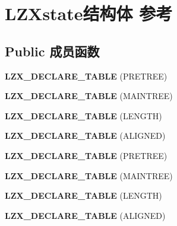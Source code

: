 \hypertarget{struct_l_z_xstate}{}\section{L\+Z\+Xstate结构体 参考}
\label{struct_l_z_xstate}
\subsection*{Public 成员函数}
\begin{DoxyCompactItemize}
\item 
\mbox{\label{struct_l_z_xstate_a576beb3aa07eb9cf307114e1fdc7f151}} 
{\bfseries L\+Z\+X\+\_\+\+D\+E\+C\+L\+A\+R\+E\+\_\+\+T\+A\+B\+LE} (P\+R\+E\+T\+R\+EE)
\item 
\mbox{\label{struct_l_z_xstate_a076e14ff04819bcc628829af24d9b122}} 
{\bfseries L\+Z\+X\+\_\+\+D\+E\+C\+L\+A\+R\+E\+\_\+\+T\+A\+B\+LE} (M\+A\+I\+N\+T\+R\+EE)
\item 
\mbox{\label{struct_l_z_xstate_af152c9d92b18f809675a283d7869143e}} 
{\bfseries L\+Z\+X\+\_\+\+D\+E\+C\+L\+A\+R\+E\+\_\+\+T\+A\+B\+LE} (L\+E\+N\+G\+TH)
\item 
\mbox{\label{struct_l_z_xstate_abf37582d65f7f45b91b41280c244d85a}} 
{\bfseries L\+Z\+X\+\_\+\+D\+E\+C\+L\+A\+R\+E\+\_\+\+T\+A\+B\+LE} (A\+L\+I\+G\+N\+ED)
\item 
\mbox{\label{struct_l_z_xstate_a576beb3aa07eb9cf307114e1fdc7f151}} 
{\bfseries L\+Z\+X\+\_\+\+D\+E\+C\+L\+A\+R\+E\+\_\+\+T\+A\+B\+LE} (P\+R\+E\+T\+R\+EE)
\item 
\mbox{\label{struct_l_z_xstate_a076e14ff04819bcc628829af24d9b122}} 
{\bfseries L\+Z\+X\+\_\+\+D\+E\+C\+L\+A\+R\+E\+\_\+\+T\+A\+B\+LE} (M\+A\+I\+N\+T\+R\+EE)
\item 
\mbox{\label{struct_l_z_xstate_af152c9d92b18f809675a283d7869143e}} 
{\bfseries L\+Z\+X\+\_\+\+D\+E\+C\+L\+A\+R\+E\+\_\+\+T\+A\+B\+LE} (L\+E\+N\+G\+TH)
\item 
\mbox{\label{struct_l_z_xstate_abf37582d65f7f45b91b41280c244d85a}} 
{\bfseries L\+Z\+X\+\_\+\+D\+E\+C\+L\+A\+R\+E\+\_\+\+T\+A\+B\+LE} (A\+L\+I\+G\+N\+ED)
\end{DoxyCompactItemize}
